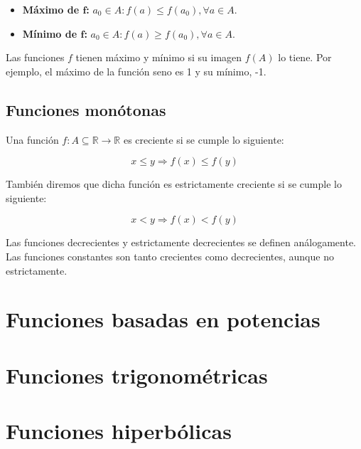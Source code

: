 \begin{itemize}
	\item\textbf{Máximo de $\boldsymbol{f}$:}
		$a_0 \in A : f(a) \leq f(a_0), \forall a \in A$.
	\item\textbf{Mínimo de $\boldsymbol{f}$:}
		$a_0 \in A : f(a) \geq f(a_0), \forall a \in A$.
\end{itemize}

Las funciones $f$ tienen máximo y mínimo si su imagen $f(A)$ lo tiene.
Por ejemplo, el máximo de la función seno es 1 y su mínimo, -1.

\subsection{Funciones monótonas}

Una función $f : A \subseteq \mathbb{R} \rightarrow \mathbb{R}$ es creciente si se cumple lo siguiente:

\[x \leq y \Rightarrow f(x) \leq f(y)\]

También diremos que dicha función es estrictamente creciente si se cumple lo siguiente:

\[x < y \Rightarrow f(x) < f(y)\]

Las funciones decrecientes y estrictamente decrecientes se definen análogamente.
Las funciones constantes son tanto crecientes como decrecientes, aunque no estrictamente.

\section{Funciones basadas en potencias}

\section{Funciones trigonométricas}

\section{Funciones hiperbólicas}


